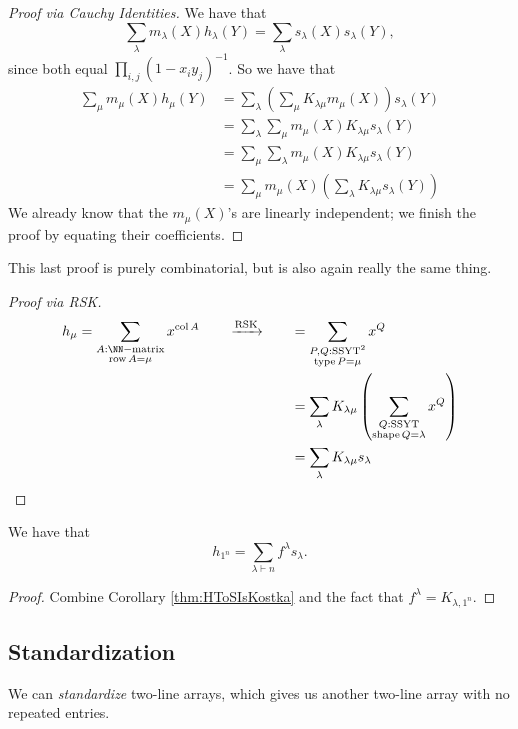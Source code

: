 \documentclass{article}
\DeclareMathOperator{\RSK}{RSK}
\DeclareMathOperator{\row}{row}
\DeclareMathOperator{\col}{col}
\DeclareMathOperator{\shape}{shape}
\DeclareMathOperator{\type}{type}
\DeclareMathOperator{\SSYT}{SSYT}
\newcommand{\rskarrow}{\ensuremath\xrightarrow{\RSK}}
\begin{document}
\begin{proof}[Proof via Cauchy Identities]
    We have that
    \[
        \sum_\lambda m_\lambda(X)h_\lambda(Y) = \sum_\lambda s_\lambda(X) s_\lambda(Y),
    \]
    since both equal $\prod_{i,j}(1-x_iy_j)^{-1}$.
    So we have that
    \begin{align*}
        \sum_\mu m_\mu(X)h_\mu(Y) &= \sum_\lambda \left( \sum_\mu K_{\lambda\mu} m_\mu(X) \right) s_\lambda(Y) \\
                                  &= \sum_\lambda \sum_\mu m_\mu(X) K_{\lambda\mu} s_\lambda(Y) \\
                                  &= \sum_\mu \sum_\lambda m_\mu(X) K_{\lambda\mu} s_\lambda(Y) \\
                                  &= \sum_\mu m_\mu(X) \left(\sum_\lambda K_{\lambda\mu} s_\lambda(Y)\right)
    \end{align*}
    We already know that the $m_\mu(X)$'s are linearly independent; we finish the proof by equating their coefficients.
\end{proof}

This last proof is purely combinatorial, but is also again really the same thing. 

\begin{proof}[Proof via RSK]
    \begin{align*}
        h_\mu = \sum_{\substack{A:\NN-\text{matrix}\\\row A=\mu}} x^{\col A}
              \qquad\rskarrow\qquad
              &=\sum_{\substack{P,Q:\SSYT^2\\\type P=\mu}} x^Q  \\
              &= \sum_\lambda K_{\lambda\mu} \left(\sum_{\substack{Q:\SSYT\\\shape Q=\lambda}} x^Q\right) \\
              &= \sum_\lambda K_{\lambda\mu} s_\lambda
    \end{align*}
\end{proof}

\begin{corollary}
    We have that
    \[
        h_{1^n} = \sum_{\lambda \vdash n} f^\lambda s_\lambda.
    \]
\end{corollary}

\begin{proof}
    Combine Corollary \ref{thm:HToSIsKostka} and the fact that $f^\lambda = K_{\lambda,1^n}$.
\end{proof}

\subsection{Standardization}
We can \textit{standardize} two-line arrays, which gives us another two-line array with no repeated entries.
\end{document}
